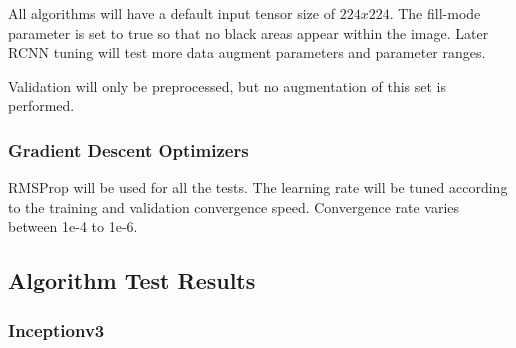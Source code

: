 \documentclass{IEEEtran}
\begin{document}
All algorithms will have a default input tensor size of $224 x 224$. The fill-mode parameter is set to true so that no black areas appear within the image. Later RCNN tuning will test more data augment parameters and parameter ranges. \newline

Validation will only be preprocessed, but no augmentation of this set is performed.\newline


\subsubsection{Gradient Descent Optimizers}

RMSProp will be used for all the tests. The learning rate will be tuned according to the training and validation convergence speed. Convergence rate varies between 1e-4 to 1e-6.


\subsection{Algorithm Test Results}

\subsubsection{Inceptionv3}
\end{document}
